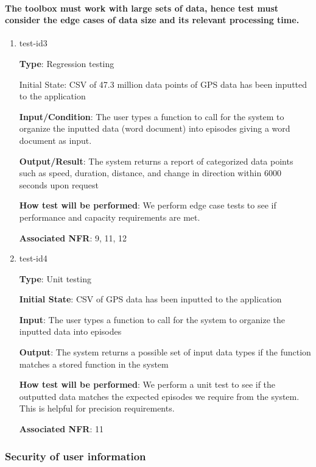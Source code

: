 \documentclass[12pt, titlepage]{article}
\begin{document}
\paragraph{The toolbox must work with large sets of data, hence test must consider the edge cases of data size and its relevant processing time. }

\begin{enumerate}

\item{test-id3\\}

\textbf{Type}: Regression testing
					
Initial State: CSV of 47.3 million data points of GPS data has been inputted to the application
					
\textbf{Input/Condition}: The user types a function to call for the system to organize the
inputted data (word document) into episodes giving a word document as input. 
					
\textbf{Output/Result}: The system returns a report of categorized data points such
as speed, duration, distance, and change in direction within 6000 seconds upon request
					
\textbf{How test will be performed}: We perform edge case tests to see if performance and capacity requirements are met. 

\textbf{Associated NFR}: 9, 11, 12

\item{test-id4\\}

\textbf{Type}: Unit testing
					
\textbf{Initial State}: CSV of GPS data has been inputted to the application
					
\textbf{Input}: The user types a function to call for the system to organize the
inputted data into episodes
					
\textbf{Output}: The system returns a possible set of input data types if the function matches a stored function in the system
					
\textbf{How test will be performed}: We perform a unit test to see if the outputted data matches the expected episodes we require from the system. This is helpful for precision requirements.

\textbf{Associated NFR}: 11

\end{enumerate}


\subsubsection{Security of user information}
		
\end{document}

